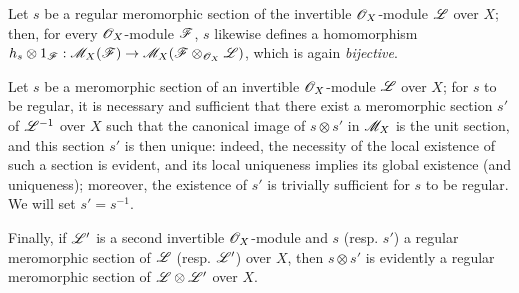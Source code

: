 \begin{env}[20.1.9]
\label{IV.20.1.9}
Let $s$ be a regular meromorphic section of the invertible $\mathscr{O}_X$-module $\mathscr{L}$ over $X$; then, for every $\mathscr{O}_X$-module $\mathscr{F}$, $s$ likewise defines a homomorphism $h_s\otimes1_{\mathscr{F}}:\mathscr{M}_X(\mathscr{F})\to\mathscr{M}_X(\mathscr{F}\otimes_{\mathscr{O}_X}\mathscr{L})$, which is again \emph{bijective}.
\end{env}

\begin{env}[20.1.10]
\label{IV.20.1.10}
Let $s$ be a meromorphic section of an invertible $\mathscr{O}_X$-module $\mathscr{L}$ over $X$; for $s$ to be regular, it is necessary and sufficient that there exist a meromorphic section $s'$ of $\mathscr{L}^{-1}$ over $X$ such that the canonical image of $s\otimes s'$ in $\mathscr{M}_X$  is the unit section, and this section $s'$ is then unique: indeed, the necessity of the local existence of such a section is evident, and its local uniqueness implies its global existence (and uniqueness); moreover, the existence of $s'$ is trivially sufficient for $s$ to be regular.
We will set $s'=s^{-1}$.

Finally, if $\mathscr{L}'$ is a second invertible $\mathscr{O}_X$-module and $s$ (resp. $s'$) a regular meromorphic section of $\mathscr{L}$ (resp. $\mathscr{L}'$) over $X$, then $s\otimes s'$ is evidently a regular meromorphic section of $\mathscr{L}\otimes\mathscr{L}'$ over $X$.
\end{env}

